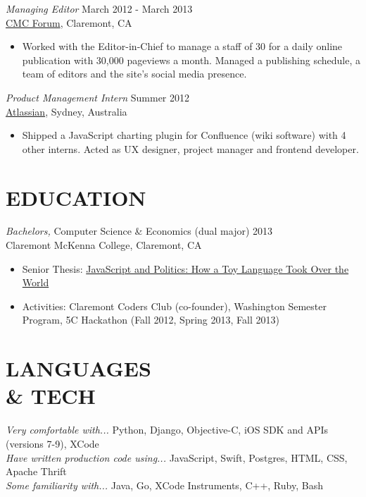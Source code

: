 \documentclass[margin, 10pt]{res}
\begin{document}
\begin{resume}
\begin{flushleft}
{\sl Managing Editor} \hfill March 2012 - March 2013 \\
\href{http://cmcforum.com/}{CMC Forum}, Claremont, CA
\begin{itemize}
\item Worked with the Editor-in-Chief to manage a staff of 30 for a daily online publication with 30,000 pageviews a month. Managed a publishing schedule, a team of editors and the site's social media presence.
\end{itemize}

{\sl Product Management Intern} \hfill Summer 2012 \\
\href{https://www.atlassian.com/}{Atlassian}, Sydney, Australia
\begin{itemize}
\item Shipped a JavaScript charting plugin for Confluence (wiki software) with 4 other interns. Acted as UX designer, project manager and frontend developer.
\end{itemize}


\section{EDUCATION}

{\sl Bachelors,} Computer Science \& Economics (dual major) \hfill 2013 \\
Claremont McKenna College, Claremont, CA
\begin{itemize} \itemsep -1pt %
\item Senior Thesis: \href{http://scholarship.claremont.edu/cmc_theses/758/}{JavaScript and Politics: How a Toy Language Took Over the World}
\item Activities: Claremont Coders Club (co-founder), Washington Semester Program, 5C Hackathon (Fall 2012, Spring 2013, Fall 2013)
\end{itemize}


\section{LANGUAGES \\ \& TECH }
{\sl Very comfortable with...} Python, Django, Objective-C, iOS SDK and APIs (versions 7-9), XCode \\
{\sl Have written production code using...} JavaScript, Swift, Postgres, HTML, CSS, Apache Thrift \\
{\sl Some familiarity with...} Java, Go, XCode Instruments, C++, Ruby, Bash


\end{flushleft}
\end{resume}
\end{document}
